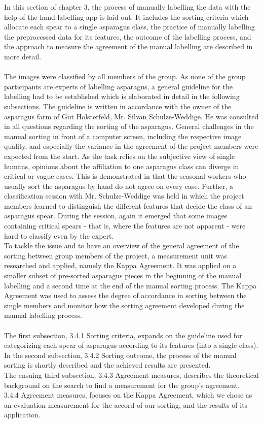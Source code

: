 In this section of chapter 3, the process of manually labelling the data with the help of the hand-labelling app is laid out. It includes the sorting criteria which allocate each spear to a single asparagus class, the practice of manually labelling the preprocessed data for its features, the outcome of the labelling process, and the approach to measure the agreement of the manual labelling are described in more detail. \\
\\
The images were classified by all members of the group. As none of the group participants are experts of labelling asparagus, a general guideline for the labelling had to be established which is elaborated in detail in the following subsections. The guideline is written in accordance with the owner of the asparagus farm of Gut Holsterfeld, Mr. Silvan Schulze-Weddige. He was consulted in all questions regarding the sorting of the asparagus.
General challenges in the manual sorting in front of a computer screen, including the respective image quality, and especially the variance in the agreement of the project members were expected from the start. As the task relies on the subjective view of single humans, opinions about the affiliation to one asparagus class can diverge in critical or vague cases.  This is demonstrated in that the seasonal workers who usually sort the asparagus by hand do not agree on every case. Further, a classification session with Mr. Schulze-Weddige was held in which the project members learned to distinguish the different features that decide the class of an asparagus spear. During the session, again it emerged that some images containing critical spears - that is, where the features are not apparent - were hard to classify even by the expert. \\
To tackle the issue and to have an overview of the general agreement of the sorting between group members of the project, a measurement unit was researched and applied, namely the Kappa Agreement. It was applied on a smaller subset of pre-sorted asparagus pieces in the beginning of the manual labelling and a second time at the end of the manual sorting process. The Kappa Agreement was used to assess the degree of accordance in sorting between the single members and monitor how the sorting agreement developed during the manual labelling process. \\
\\
The first subsection, 3.4.1 Sorting criteria, expands on the guideline used for categorizing each spear of asparagus according to its features (into a single class).\\
In the second subsection, 3.4.2 Sorting outcome, the process of the manual sorting is shortly described and the achieved results are presented. \\
The ensuing third subsection, 3.4.3 Agreement measures, describes the theoretical background on the search to find a measurement for the group's agreement. \\
3.4.4 Agreement measures, focuses on the Kappa Agreement, which we chose as an evaluation measurement for the accord of our sorting, and the results of its application.


